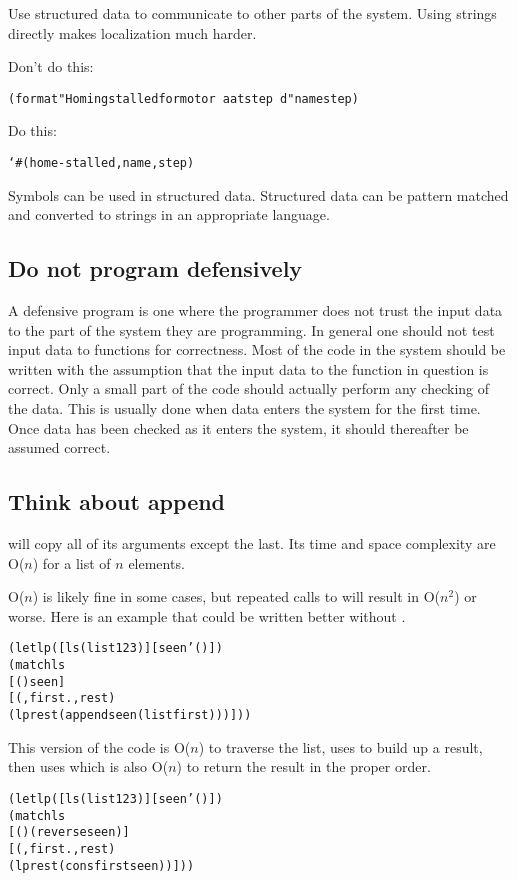 \documentclass[letterpaper,11pt,twoside,final]{article}
\begin{document}
Use structured data to communicate to other parts of the system. Using
strings directly makes localization much harder.

Don't do this:
\antipar
\begin{alltt}
(format "Homing stalled for motor ~a at step ~d" name step)
\end{alltt}

Do this:
\antipar
\begin{alltt}
`\#(home-stalled ,name ,step)
\end{alltt}

Symbols can be used in structured data. Structured data can be pattern
matched and converted to strings in an appropriate language.

\subsection* {Do not program defensively}

A defensive program is one where the programmer does not trust the
input data to the part of the system they are programming. In general
one should not test input data to functions for correctness. Most of
the code in the system should be written with the assumption that the
input data to the function in question is correct. Only a small part
of the code should actually perform any checking of the data. This is
usually done when data enters the system for the first time. Once data
has been checked as it enters the system, it should thereafter be
assumed correct.

\subsection* {Think about append}

 will copy all of its arguments except the last. Its
time and space complexity are O($n$) for a list of $n$ elements.

O($n$) is likely fine in some cases, but repeated calls to
 will result in O($n^2$) or worse. Here is an example
that could be written better without .
\antipar
\begin{alltt}
(let lp ([ls (list 1 2 3)] [seen '()])
  (match ls
    [() seen]
    [(,first . ,rest)
     (lp rest (append seen (list first)))]))
\end{alltt}

This version of the code is O($n$) to traverse the list, uses
 to build up a result, then uses  which
is also O($n$) to return the result in the proper order.
\antipar
\begin{alltt}
(let lp ([ls (list 1 2 3)] [seen '()])
  (match ls
    [() (reverse seen)]
    [(,first . ,rest)
     (lp rest (cons first seen))]))
\end{alltt}
\end{document}
